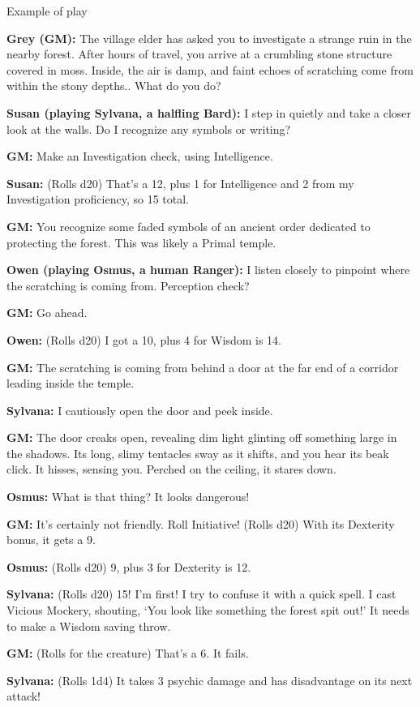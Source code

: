 Example of play

\textbf{Grey (GM):} The village elder has asked you to investigate a
strange ruin in the nearby forest. After hours of travel, you arrive at
a crumbling stone structure covered in moss. Inside, the air is damp,
and faint echoes of scratching come from within the stony depths.. What
do you do?

\textbf{Susan (playing Sylvana, a halfling Bard):} I step in quietly and
take a closer look at the walls. Do I recognize any symbols or writing?

\textbf{GM:} Make an Investigation check, using Intelligence.

\textbf{Susan:} (Rolls d20) That's a 12, plus 1 for Intelligence and 2
from my Investigation proficiency, so 15 total.

\textbf{GM:} You recognize some faded symbols of an ancient order
dedicated to protecting the forest. This was likely a Primal temple.

\textbf{Owen (playing Osmus, a human Ranger):} I listen closely to
pinpoint where the scratching is coming from. Perception check?

\textbf{GM:} Go ahead.

\textbf{Owen:} (Rolls d20) I got a 10, plus 4 for Wisdom is 14.

\textbf{GM:} The scratching is coming from behind a door at the far end
of a corridor leading inside the temple.

\textbf{Sylvana:} I cautiously open the door and peek inside.

\textbf{GM:} The door creaks open, revealing dim light glinting off
something large in the shadows. Its long, slimy tentacles sway as it
shifts, and you hear its beak click. It hisses, sensing you. Perched on
the ceiling, it stares down.

\textbf{Osmus:} What is that thing? It looks dangerous!

\textbf{GM:} It's certainly not friendly. Roll Initiative! (Rolls d20)
With its Dexterity bonus, it gets a 9.

\textbf{Osmus:} (Rolls d20) 9, plus 3 for Dexterity is 12.

\textbf{Sylvana:} (Rolls d20) 15! I'm first! I try to confuse it with a
quick spell. I cast Vicious Mockery, shouting, `You look like something
the forest spit out!' It needs to make a Wisdom saving throw.

\textbf{GM:} (Rolls for the creature) That's a 6. It fails.

\textbf{Sylvana:} (Rolls 1d4) It takes 3 psychic damage and has
disadvantage on its next attack!

